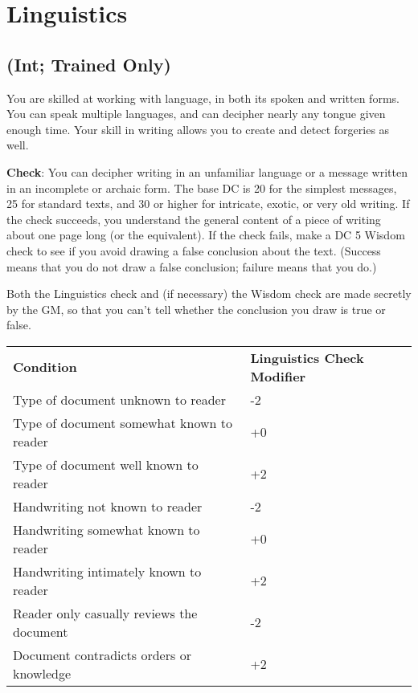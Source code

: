 \section{Linguistics}

\label{f0}
\subsection{(Int; Trained Only)}

				
You are skilled at working with language, in both its spoken and written forms. You can speak multiple languages, and can decipher nearly any tongue given enough time. Your skill in writing allows you to create and detect forgeries as well.
				
\textbf{Check}: You can decipher writing in an unfamiliar language or a message written in an incomplete or archaic form. The base DC is 20 for the simplest messages, 25 for standard texts, and 30 or higher for intricate, exotic, or very old writing. If the check succeeds, you understand the general content of a piece of writing about one page long (or the equivalent). If the check fails, make a DC 5 Wisdom check to see if you avoid drawing a false conclusion about the text. (Success means that you do not draw a false conclusion; failure means that you do.)
				
Both the Linguistics check and (if necessary) the Wisdom check are made secretly by the GM, so that you can't tell whether the conclusion you draw is true or false.
\begin{table}
 \sffamily
 \begin{tabular}{ll}
\textbf{Condition} & \textbf{Linguistics Check Modifier}\\
Type of document unknown to reader&-2\\
Type of document somewhat known to reader &+0\\
Type of document well known to reader & +2 \\
Handwriting not known to reader & -2\\
Handwriting somewhat known to reader & +0\\
Handwriting intimately known to reader & +2\\
Reader only casually reviews the document & -2\\
Document contradicts orders or knowledge & +2\\
 \end{tabular}

\end{table}
		
